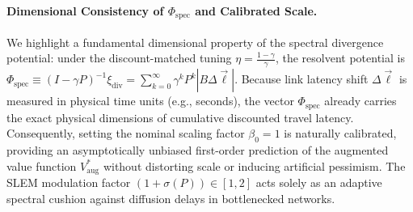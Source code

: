 \documentclass[11pt,a4paper]{article}
\begin{document}
\paragraph{Dimensional Consistency of $\Phi_{\text{spec}}$ and Calibrated Scale.}
We highlight a fundamental dimensional property of the spectral divergence potential: under the discount-matched tuning $\eta = \frac{1-\gamma}{\gamma}$, the resolvent potential is $\Phi_{\text{spec}} \equiv (I - \gamma P)^{-1} \xi_{\text{div}} = \sum_{k=0}^\infty \gamma^k P^k |B \Delta \vec{\ell}|$. Because link latency shift $\Delta \vec{\ell}$ is measured in physical time units (e.g., seconds), the vector $\Phi_{\text{spec}}$ already carries the exact physical dimensions of cumulative discounted travel latency. Consequently, setting the nominal scaling factor $\beta_0 = 1$ is naturally calibrated, providing an asymptotically unbiased first-order prediction of the augmented value function $V_{\text{aug}}^*$ without distorting scale or inducing artificial pessimism. The SLEM modulation factor $(1 + \sigma(P)) \in [1, 2]$ acts solely as an adaptive spectral cushion against diffusion delays in bottlenecked networks.
\end{document}
